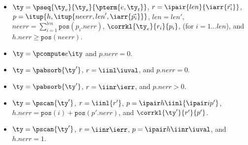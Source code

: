 \begin{definition}
\begin{itemize}
  \item $\ty = \pseq {\ty_e}{\ty_s}{\pterm {e,\ty_t}}$, 
    $r = \ipair {len} {\iarr{\vec {r_i}}}$, $p = \itup{h,\itup{{neerr},{len}',\iarr {\vec {p_i}}}}$,
    ${len} = {len}'$, ${neerr} = \sum_{i=1}^{len}
    \mathtt{pos}(p_i.{nerr})$, $\corrkl {\ty_e}
    {r_i} {p_i}$, (for $i=1 \ldots {len}$), and
    $h.{nerr} \geq \mathtt{pos}({neerr})$.
  \item $\ty = \pcompute e \ity$ and $p.{nerr} = 0$.
  \item $\ty = \pabsorb {\ty'}$, $r = \iinl \iuval$, and $p.nerr = 0$.
  \item $\ty = \pabsorb {\ty'}$, $r = \iinr \ierr$, and $p.nerr > 0$.
  \item $\ty = \pscan {\ty'}$, $r =\iinl {r'}$,
      $p = \ipair h {\iinl {\ipair i {p'}}}$,
      $h.nerr = \mathtt{pos}(i) + \mathtt{pos}(p'.nerr)$, and
      $\corrkl {\ty'}{r'}{p'}$.
  \item $\ty = \pscan {\ty'}$,
      $r =\iinr \ierr$,
      $p = \ipair h {\iinr \iuval}$, and
      $h.{nerr} = 1$.
  \end{itemize}
\end{definition}

